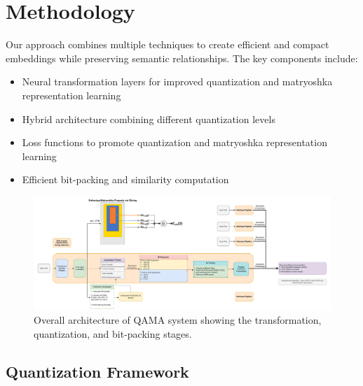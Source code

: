 \section{Methodology}
\label{sec:methodology}
Our approach combines multiple techniques to create efficient and compact embeddings while preserving semantic relationships. The key components include:
\begin{itemize}
    \item Neural transformation layers for improved quantization and matryoshka representation learning
    \item Hybrid architecture combining different quantization levels
    \item Loss functions to promote quantization and matryoshka representation learning
    \item Efficient bit-packing and similarity computation
\end{itemize}

\begin{figure}[h]
    \centering
    \includegraphics[width=\textwidth]{main-diagram.pdf}
    \caption{Overall architecture of QAMA system showing the transformation, quantization, and bit-packing stages.}
    \label{fig:system_architecture}
\end{figure}


\subsection{Quantization Framework}
\label{subsec:quantization_framework}


